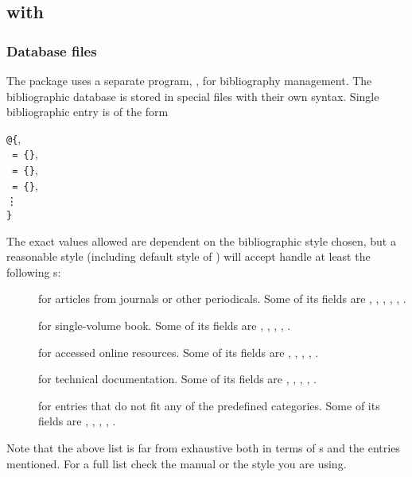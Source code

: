 \subsection{ with }

\subsubsection{Database files}
The  package uses a separate program, , for
bibliography management. The bibliographic database is stored in special
 files with their own syntax. Single bibliographic entry is of the
form
\begin{lscommand}
\texttt{@}\texttt{\{},\\
\hspace*{1em}\texttt{ = \{}\texttt{\}},\\
\hspace*{1em}\texttt{ = \{}\texttt{\}},\\
\hspace*{1em}\texttt{ = \{}\texttt{\}},\\
\hspace*{3em}\vdots\\
\texttt{\}}
\end{lscommand}
The exact values allowed are dependent on the bibliographic style chosen, but a
reasonable style (including default style of ) will accept handle
at least the following s:
\begin{description}
  \item[] for articles from journals or other periodicals. Some
  of its fields are , , ,
  , , .
  \item[] for single-volume book. Some of its fields are
  , , , ,
  .
  \item[] for accessed online resources. Some of its fields are
   , , , , .
  \item[] for technical documentation. Some of its fields are
   , , , , .
  \item[] for entries that do not fit any of the predefined
   categories. Some of its fields are , ,
   , , .
\end{description}
Note that the above list is far from exhaustive both in terms of s and the entries mentioned. For a full list check the 
manual or the style you are using.


